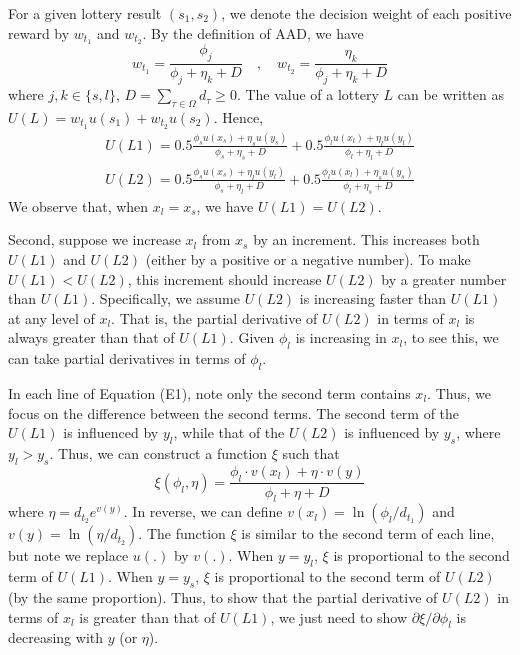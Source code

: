 \documentclass[
  12pt,
]{article}
\begin{document}
For a given lottery result \((s_1,s_2)\), we denote the decision weight
of each positive reward by \(w_{t_1}\) and \(w_{t_2}\). By the
definition of AAD, we have\[
w_{t_1} = \frac{\phi_j}{\phi_j + \eta_k +D} \quad ,\quad
w_{t_2} = \frac{\eta_k}{\phi_j + \eta_k +D}
\]where \(j,k\in\{s,l\}\), \(D=\sum_{\tau\in\Omega} d_{\tau}\geq 0\).
The value of a lottery \(L\) can be written as
\(U(L)=w_{t_1}u(s_1)+w_{t_2}u(s_2)\). Hence, \[\tag{E1}
\begin{aligned}
U(L1)=0.5\frac{\phi_s u(x_s)+\eta_s u(y_s)}{\phi_s+\eta_s+D} + 0.5\frac{\phi_l u(x_l)+\eta_l u(y_l)}{\phi_l+\eta_l+D} \\
U(L2)=0.5\frac{\phi_s u(x_s)+\eta_l u(y_l)}{\phi_s+\eta_l+D} + 0.5\frac{\phi_l u(x_l)+\eta_s u(y_s)}{\phi_l+\eta_s+D}
\end{aligned}
\]We observe that, when \(x_l=x_s\), we have \(U(L1)=U(L2)\).

Second, suppose we increase \(x_l\) from \(x_s\) by an increment. This
increases both \(U(L1)\) and \(U(L2)\) (either by a positive or a
negative number). To make \(U(L1)<U(L2)\), this increment should
increase \(U(L2)\) by a greater number than \(U(L1)\). Specifically, we
assume \(U(L2)\) is increasing faster than \(U(L1)\) at any level of
\(x_l\). That is, the partial derivative of \(U(L2)\) in terms of
\(x_l\) is always greater than that of \(U(L1)\). Given \(\phi_l\) is
increasing in \(x_l\), to see this, we can take partial derivatives in
terms of \(\phi_l\).

In each line of Equation (E1), note only the second term contains
\(x_l\). Thus, we focus on the difference between the second terms. The
second term of the \(U(L1)\) is influenced by \(y_l\), while that of the
\(U(L2)\) is influenced by \(y_s\), where \(y_l>y_s\). Thus, we can
construct a function \(\xi\) such that\[
\xi(\phi_l,\eta) = \frac{\phi_l \cdot v(x_l)+\eta\cdot v(y)}{\phi_l+\eta+D}
\]where \(\eta=d_{t_2}e^{v(y)}\). In reverse, we can define
\(v(x_l)=\ln(\phi_l/d_{t_1})\) and \(v(y)=\ln(\eta/d_{t_2})\). The
function \(\xi\) is similar to the second term of each line, but note we
replace \(u(.)\) by \(v(.)\). When \(y=y_l\), \(\xi\) is proportional to
the second term of \(U(L1)\). When \(y=y_s\), \(\xi\) is proportional to
the second term of \(U(L2)\) (by the same proportion). Thus, to show
that the partial derivative of \(U(L2)\) in terms of \(x_l\) is greater
than that of \(U(L1)\), we just need to show
\(\partial \xi/\partial \phi_l\) is decreasing with \(y\) (or \(\eta\)).
\end{document}
